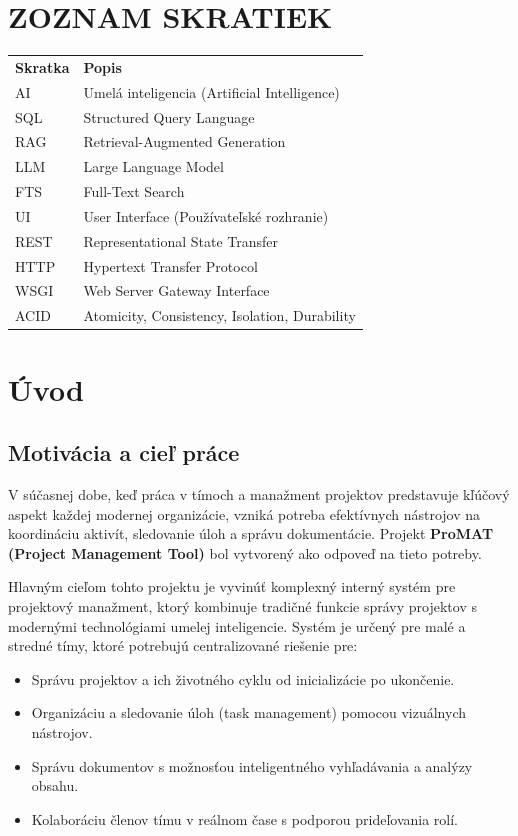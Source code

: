 \documentclass[12pt, a4paper]{article}
\begin{document}
\begin{titlepage}
\section*{ZOZNAM SKRATIEK}
\begin{tabular}{ll}
\textbf{Skratka} & \textbf{Popis} \\
AI & Umelá inteligencia (Artificial Intelligence) \\
SQL & Structured Query Language \\
RAG & Retrieval-Augmented Generation \\
LLM & Large Language Model \\
FTS & Full-Text Search \\
UI & User Interface (Používateľské rozhranie) \\
REST & Representational State Transfer \\
HTTP & Hypertext Transfer Protocol \\
WSGI & Web Server Gateway Interface \\
ACID & Atomicity, Consistency, Isolation, Durability \\
\end{tabular}

\newpage
\setcounter{page}{1}

\section{Úvod}

\subsection{Motivácia a cieľ práce}
V súčasnej dobe, keď práca v tímoch a manažment projektov predstavuje kľúčový aspekt každej modernej organizácie, vzniká potreba efektívnych nástrojov na koordináciu aktivít, sledovanie úloh a správu dokumentácie. Projekt \textbf{ProMAT (Project Management Tool)} bol vytvorený ako odpoveď na tieto potreby.

Hlavným cieľom tohto projektu je vyvinúť komplexný interný systém pre projektový manažment, ktorý kombinuje tradičné funkcie správy projektov s modernými technológiami umelej inteligencie. Systém je určený pre malé a stredné tímy, ktoré potrebujú centralizované riešenie pre:

\begin{itemize}
    \item Správu projektov a ich životného cyklu od inicializácie po ukončenie.
    \item Organizáciu a sledovanie úloh (task management) pomocou vizuálnych nástrojov.
    \item Správu dokumentov s možnosťou inteligentného vyhľadávania a analýzy obsahu.
    \item Kolaboráciu členov tímu v reálnom čase s podporou prideľovania rolí.
\end{itemize}


\end{titlepage}
\end{document}
